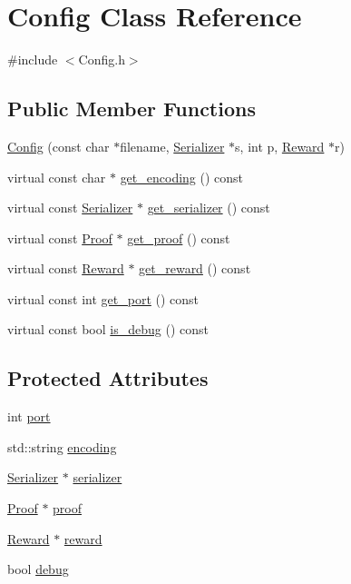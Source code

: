 \hypertarget{classConfig}{}\section{Config Class Reference}
\label{classConfig}


{\ttfamily \#include $<$Config.\+h$>$}

\subsection*{Public Member Functions}
\begin{DoxyCompactItemize}
\item 
\mbox{\hyperlink{classConfig_a215344f9d1452f24df7c0508a23fd15b}{Config}} (const char $\ast$filename, \mbox{\hyperlink{classSerializer}{Serializer}} $\ast$s, int p, \mbox{\hyperlink{classReward}{Reward}} $\ast$r)
\item 
virtual const char $\ast$ \mbox{\hyperlink{classConfig_a23f39330cd594b8855d371368adc80e4}{get\+\_\+encoding}} () const
\item 
virtual const \mbox{\hyperlink{classSerializer}{Serializer}} $\ast$ \mbox{\hyperlink{classConfig_a00399f1751e2dfa032d99208bf925ab0}{get\+\_\+serializer}} () const
\item 
virtual const \mbox{\hyperlink{classProof}{Proof}} $\ast$ \mbox{\hyperlink{classConfig_a23b6ece178053913f232eeda4ab7c7c8}{get\+\_\+proof}} () const
\item 
virtual const \mbox{\hyperlink{classReward}{Reward}} $\ast$ \mbox{\hyperlink{classConfig_a3467e8914f0a0730277cf4732443116d}{get\+\_\+reward}} () const
\item 
virtual const int \mbox{\hyperlink{classConfig_a516e5e6665ad519ab23ac4c57fb99cb6}{get\+\_\+port}} () const
\item 
virtual const bool \mbox{\hyperlink{classConfig_afc60cc21dfa15f3642f8ac1f45403450}{is\+\_\+debug}} () const
\end{DoxyCompactItemize}
\subsection*{Protected Attributes}
\begin{DoxyCompactItemize}
\item 
int \mbox{\hyperlink{classConfig_a9b99e069f6e78fcb906d5effbb600e97}{port}}
\item 
std\+::string \mbox{\hyperlink{classConfig_a9391a8a86ed88a6fefd35ec89c10e861}{encoding}}
\item 
\mbox{\hyperlink{classSerializer}{Serializer}} $\ast$ \mbox{\hyperlink{classConfig_afcd74e506e51f57020bce34fe92cb9dc}{serializer}}
\item 
\mbox{\hyperlink{classProof}{Proof}} $\ast$ \mbox{\hyperlink{classConfig_ac220c43cceafde6291b29d44f61c3785}{proof}}
\item 
\mbox{\hyperlink{classReward}{Reward}} $\ast$ \mbox{\hyperlink{classConfig_a6b3fb8d8312246a1b204d04bd872a187}{reward}}
\item 
bool \mbox{\hyperlink{classConfig_a8ecbe763ad856693ff85cba5182e1f2e}{debug}}
\end{DoxyCompactItemize}



